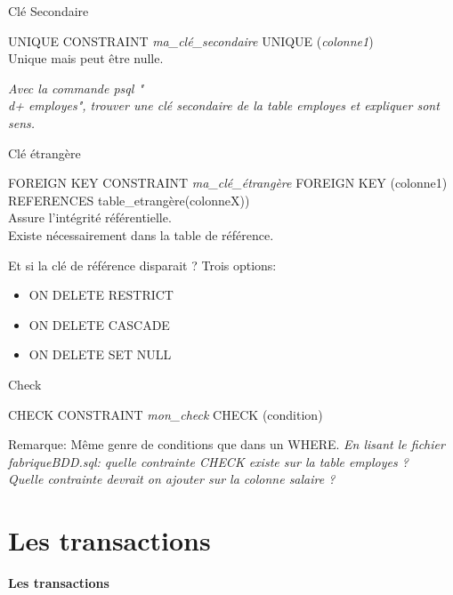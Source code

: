 \documentclass[xetex,dvipsnames]{beamer}
\begin{document}
\begin{frame}{Clé Secondaire}
	\begin{alertblock}{UNIQUE}
		CONSTRAINT \textit{ma\_clé\_secondaire} UNIQUE (\textit{colonne1})\\
		Unique mais peut être nulle.
	\end{alertblock}
	\textit{Avec la commande psql "\\d+ employes", trouver une clé secondaire de la table employes et expliquer sont sens.}\\	
\end{frame}

\begin{frame}{Clé étrangère}
	\begin{alertblock}{FOREIGN KEY}
		CONSTRAINT \textit{ma\_clé\_étrangère} FOREIGN KEY (colonne1) REFERENCES table\_etrangère(colonneX))\\
		Assure l'intégrité référentielle.\\
		Existe nécessairement dans la table de référence.
	\end{alertblock}
	\begin{block}{Et si la clé de référence disparait ?}
		Trois options:
		\begin{itemize}
			\item ON DELETE RESTRICT
			\item ON DELETE CASCADE
			\item ON DELETE SET NULL
		\end{itemize}				
	\end{block}
\end{frame}


\begin{frame}{Check}
	\begin{alertblock}{CHECK}
		CONSTRAINT \textit{mon\_check} CHECK (condition)\\
	\end{alertblock}
	Remarque: Même genre de conditions que dans un WHERE.
	\vspace*{1em}
	\textit{En lisant le fichier fabriqueBDD.sql: quelle contrainte CHECK existe sur la table employes ?}\\
	\textit{Quelle contrainte devrait on ajouter sur la colonne salaire ?}\\
\end{frame}




\section{Les transactions}
\begin{frame}
\begin{center}
{\LARGE \textbf{Les transactions}}
\end{center}
\end{frame}
\end{document}
